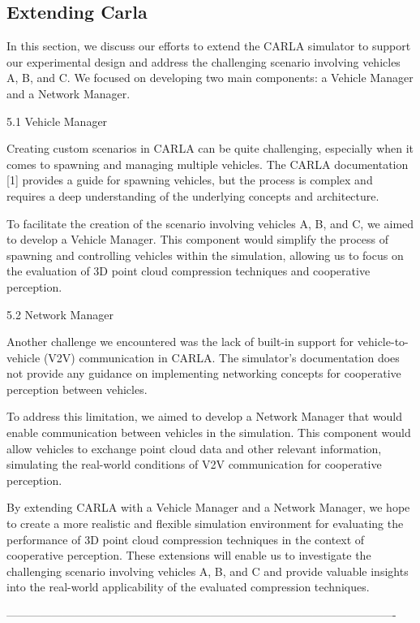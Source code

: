 \documentclass[conference]{IEEEtran}
\begin{document}
\subsection{Extending Carla}
In this section, we discuss our efforts to extend the CARLA simulator to support our experimental design and address the challenging scenario involving vehicles A, B, and C. We focused on developing two main components: a Vehicle Manager and a Network Manager.

5.1 Vehicle Manager

Creating custom scenarios in CARLA can be quite challenging, especially when it comes to spawning and managing multiple vehicles. The CARLA documentation [1] provides a guide for spawning vehicles, but the process is complex and requires a deep understanding of the underlying concepts and architecture.

To facilitate the creation of the scenario involving vehicles A, B, and C, we aimed to develop a Vehicle Manager. This component would simplify the process of spawning and controlling vehicles within the simulation, allowing us to focus on the evaluation of 3D point cloud compression techniques and cooperative perception.

5.2 Network Manager

Another challenge we encountered was the lack of built-in support for vehicle-to-vehicle (V2V) communication in CARLA. The simulator's documentation does not provide any guidance on implementing networking concepts for cooperative perception between vehicles.

To address this limitation, we aimed to develop a Network Manager that would enable communication between vehicles in the simulation. This component would allow vehicles to exchange point cloud data and other relevant information, simulating the real-world conditions of V2V communication for cooperative perception.

By extending CARLA with a Vehicle Manager and a Network Manager, we hope to create a more realistic and flexible simulation environment for evaluating the performance of 3D point cloud compression techniques in the context of cooperative perception. These extensions will enable us to investigate the challenging scenario involving vehicles A, B, and C and provide valuable insights into the real-world applicability of the evaluated compression techniques.

-------------------------------------------------------------------------------------------------------
\end{document}
